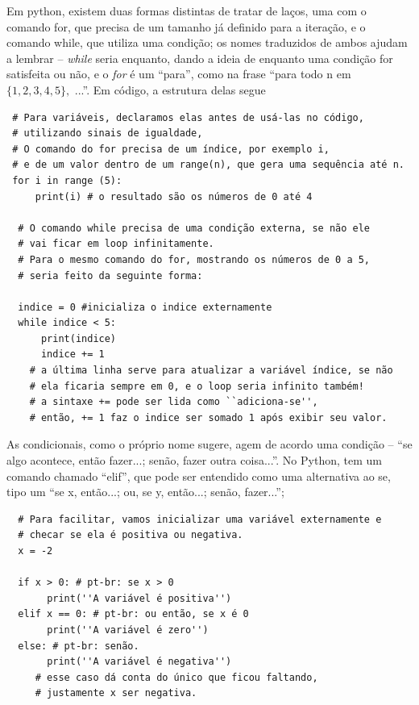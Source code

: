 \documentclass[../numerical_methods.tex]{subfiles}
\begin{document}
Em python, existem duas formas distintas de tratar de laços, uma com o comando for, que precisa de um tamanho já definido para a iteração, e o comando while, que utiliza uma condição; os nomes traduzidos de ambos ajudam a lembrar -- \textit{while} seria enquanto, dando a ideia de enquanto uma condição for satisfeita ou não, e o \textit{for} é um ``para'', como na frase ``para todo n em \(\{1,2,3,4,5\},\) ...''. Em código, a estrutura delas segue
\begin{verbatim}
 # Para variáveis, declaramos elas antes de usá-las no código,
 # utilizando sinais de igualdade,
 # O comando do for precisa de um índice, por exemplo i,
 # e de um valor dentro de um range(n), que gera uma sequência até n.
 for i in range (5):  
     print(i) # o resultado são os números de 0 até 4
  
  # O comando while precisa de uma condição externa, se não ele 
  # vai ficar em loop infinitamente.
  # Para o mesmo comando do for, mostrando os números de 0 a 5, 
  # seria feito da seguinte forma: 

  indice = 0 #inicializa o indice externamente 
  while indice < 5: 
      print(indice) 
      indice += 1
    # a última linha serve para atualizar a variável índice, se não 
    # ela ficaria sempre em 0, e o loop seria infinito também! 
    # a sintaxe += pode ser lida como ``adiciona-se'',
    # então, += 1 faz o indice ser somado 1 após exibir seu valor.

 \end{verbatim}

As condicionais, como o próprio nome sugere, agem de acordo uma condição -- ``se algo acontece, então fazer...; senão, fazer outra coisa...''.
No Python, tem um comando chamado ``elif'', que pode ser entendido como uma alternativa ao se, tipo um ``se x, então...; ou, se y, então...; senão, fazer...'';
\begin{verbatim}
  # Para facilitar, vamos inicializar uma variável externamente e 
  # checar se ela é positiva ou negativa.
  x = -2 

  if x > 0: # pt-br: se x > 0
       print(''A variável é positiva'')
  elif x == 0: # pt-br: ou então, se x é 0
       print(''A variável é zero'')
  else: # pt-br: senão.
       print(''A variável é negativa'') 
     # esse caso dá conta do único que ficou faltando, 
     # justamente x ser negativa.
    
\end{verbatim}
\end{document}
